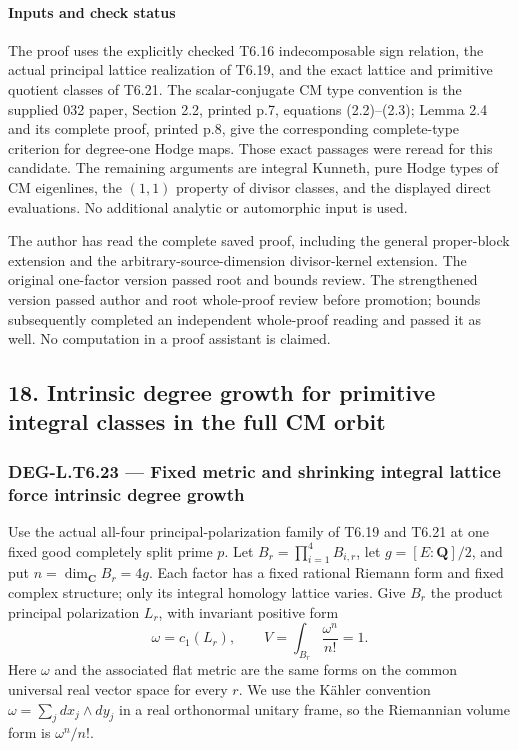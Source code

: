 \paragraph{Inputs and check status}\label{inputs-and-check-status}

The proof uses the explicitly checked T6.16 indecomposable sign relation, the actual principal lattice realization of T6.19, and the exact lattice and primitive quotient classes of T6.21. The scalar-conjugate CM type convention is the supplied 032 paper, Section 2.2, printed p.7, equations (2.2)--(2.3); Lemma 2.4 and its complete proof, printed p.8, give the corresponding complete-type criterion for degree-one Hodge maps. Those exact passages were reread for this candidate. The remaining arguments are integral Kunneth, pure Hodge types of CM eigenlines, the \((1,1)\) property of divisor classes, and the displayed direct evaluations. No additional analytic or automorphic input is used.

The author has read the complete saved proof, including the general proper-block extension and the arbitrary-source-dimension divisor-kernel extension. The original one-factor version passed root and bounds review. The strengthened version passed author and root whole-proof review before promotion; bounds subsequently completed an independent whole-proof reading and passed it as well. No computation in a proof assistant is claimed.

\subsection{18. Intrinsic degree growth for primitive integral classes in the full CM orbit}\label{intrinsic-degree-growth-for-primitive-integral-classes-in-the-full-cm-orbit}

\subsubsection{DEG-L.T6.23 --- Fixed metric and shrinking integral lattice force intrinsic degree growth}\label{DEG-L.T6.23}

Use the actual all-four principal-polarization family of T6.19 and T6.21 at one fixed good completely split prime \(p\). Let \(B_r=\prod_{i=1}^4B_{i,r}\), let \(g=[E:\mathbf Q]/2\), and put \(n=\dim_{\mathbf C}B_r=4g\). Each factor has a fixed rational Riemann form and fixed complex structure; only its integral homology lattice varies. Give \(B_r\) the product principal polarization \(L_r\), with invariant positive form \[
 \omega=c_1(L_r),\qquad
 V=\int_{B_r}\frac{\omega^n}{n!}=1.
 \tag{T23.1}
\] Here \(\omega\) and the associated flat metric are the same forms on the common universal real vector space for every \(r\). We use the Kähler convention \(\omega=\sum_j dx_j\wedge dy_j\) in a real orthonormal unitary frame, so the Riemannian volume form is \(\omega^n/n!\).

